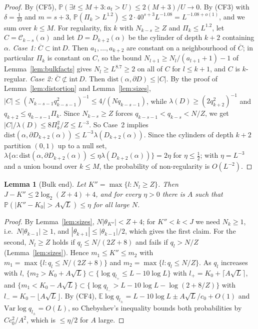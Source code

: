 \documentclass[11pt]{amsart}
\newtheorem{lemma}[theorem]{Lemma}
\theoremstyle{definition}
\numberwithin{equation}{section}
\newcommand{\E}{\mathbb{E}}
\newcommand{\Prob}{\mathbb{P}}
\newcommand{\cC}{\mathcal{C}}
\begin{document}
\begin{proof}
By (CF5), $\Prob(\exists t\le M+3:a_t>U)\le2(M+3)/U\to0$. By (CF3) with $\delta=\frac1{10}$ and $m=s+3$,
$\Prob(\Pi_k>L^{1.2})\le2\cdot40^{s+3}L^{-1.08}=L^{-1.08+o(1)}$, and we sum over $k\le M$.
For regularity, fix $k$ with $N_{k-s}\ge Z$ and $\Pi_k\le L^{1.2}$, let $C=\cC_{k-s}(\alpha)$ and let $D=D_{k+2}(\alpha)$ be the cylinder of depth
$k+2$ containing $\alpha$. \emph{Case 1:} $\overline C\subset\mathrm{int}\,D$. Then $a_1,\dots,a_{k+2}$ are constant on a neighbourhood of
$\overline C$; in particular $\Pi_k$ is constant on $C$, so the bound $N_{l+1}\ge N_l/(a_{l+1}+1)-1$ of Lemma~\ref{lem:bulkfacts} gives
$N_l\ge L^{8.7}\ge2$ on all of $C$ for $l\le k+1$, and $C$ is $k$-regular. \emph{Case 2:} $\overline C\not\subset\mathrm{int}\,D$. Then
$\mathrm{dist}(\alpha,\partial D)\le|C|$. By the proof of Lemma~\ref{lem:distortion} and Lemma~\ref{lem:sizes},
$|C|\le(N_{k-s-1}q_{k-s-1}^2)^{-1}\le4/(Nq_{k-s-1})$, while $\lambda(D)\ge(2q_{k+2}^2)^{-1}$ and $q_{k+2}\le q_{k-s-1}\Pi_k$. Since $N_{k-s}\ge Z$
forces $q_{k-s-1}<q_{k-s}<N/Z$, we get $|C|/\lambda(D)\le8\Pi_k^2/Z\le L^{-3}$. So Case~2 implies
$\mathrm{dist}(\alpha,\partial D_{k+2}(\alpha))\le L^{-3}\lambda(D_{k+2}(\alpha))$. Since the cylinders of depth $k+2$ partition $(0,1)$ up to a
null set, $\lambda\{\alpha:\mathrm{dist}(\alpha,\partial D_{k+2}(\alpha))\le\eta\lambda(D_{k+2}(\alpha))\}=2\eta$ for $\eta\le\frac12$; with $\eta=L^{-3}$ and a
union bound over $k\le M$, the probability of non-regularity is $O(L^{-2})$.
\end{proof}

\begin{lemma}[Bulk end]\label{lem:bulkend}
Let $K''=\max\{l:N_l\ge Z\}$. Then $J-K''\le2\log_2(Z+4)+4$, and for every $\eta>0$ there is $A$ such that
$\Prob(|K''-K_0|>A\sqrt L)\le\eta$ for all large $N$.
\end{lemma}

\begin{proof}
By Lemma~\ref{lem:sizes}, $N|\theta_{K''}|<Z+4$; for $K''<k<J$ we need $N_k\ge1$, i.e.\ $N|\theta_{k-1}|\ge1$, and $|\theta_{k+1}|\le|\theta_{k-1}|/2$, which gives the first
claim. For the second, $N_l\ge Z$ holds if $q_l\le N/(2Z+8)$ and fails if $q_l>N/Z$ (Lemma~\ref{lem:sizes}). Hence $m_1\le K''\le m_2$ with
$m_1=\max\{l:q_l\le N/(2Z+8)\}$ and $m_2=\max\{l:q_l\le N/Z\}$. As $q_l$ increases with $l$, $\{m_2>K_0+A\sqrt L\}\subset\{\log q_{l_+}\le L-10\log L\}$
with $l_+=K_0+\lceil A\sqrt L\rceil$, and $\{m_1<K_0-A\sqrt L\}\subset\{\log q_{l_-}>L-10\log L-\log(2+8/Z)\}$ with $l_-=K_0-\lfloor A\sqrt L\rfloor$.
By (CF4), $\E\log q_{l_\pm}=L-10\log L\pm A\sqrt L/c_0+O(1)$ and $\mathrm{Var}\log q_{l_\pm}=O(L)$, so Chebyshev's inequality bounds both
probabilities by $Cc_0^2/A^2$, which is $\le\eta/2$ for $A$ large.
\end{proof}
\end{document}
